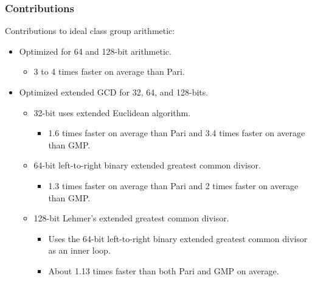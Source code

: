 \documentclass{beamer}
\begin{document}
\begin{frame}
\frametitle{Contributions}
Contributions to ideal class group arithmetic:
\begin{itemize} %
\item Optimized for 64 and 128-bit arithmetic.
	\begin{itemize}
	\item 3 to 4 times faster on average than Pari.
	\end{itemize}
\item Optimized extended GCD for 32, 64, and 128-bits.
	\begin{itemize}
	\item 32-bit uses extended Euclidean algorithm.
		\begin{itemize}
		\item 1.6 times faster on average than Pari and 3.4 times faster on average than GMP.
		\end{itemize}
	\item 64-bit left-to-right binary extended greatest common divisor.
		\begin{itemize}
		\item 1.3 times faster on average than Pari and 2 times faster on average than GMP.
		\end{itemize}
	\item 128-bit Lehmer's extended greatest common divisor.
		\begin{itemize}
		\item Uses the 64-bit left-to-right binary extended greatest common divisor as an inner loop.
		\item About 1.13 times faster than both Pari and GMP on average.
		\end{itemize}
	\end{itemize}
\end{itemize}
\end{frame}
\end{document}
